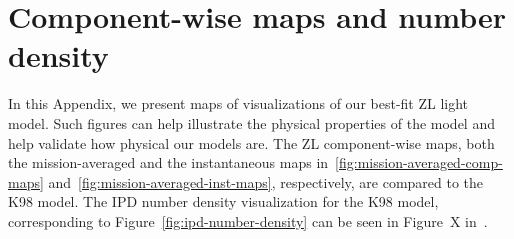 \documentclass[twocolumn]{aa}
\begin{document}
\clearpage
\section{Component-wise maps and number density}
\label{sec:zodi-comps}

In this Appendix, we present maps of visualizations of our best-fit ZL 
light model. Such figures can help illustrate the physical properties 
of the model and help validate how physical our models are. The ZL 
component-wise maps, both the mission-averaged and the instantaneous maps 
in~\ref{fig:mission-averaged-comp-maps} 
and~\ref{fig:mission-averaged-inst-maps}, respectively, are compared to 
the K98 model. The IPD number density visualization for the K98 model, 
corresponding to Figure~\ref{fig:ipd-number-density} can be seen in 
Figure~X in~\cite{San2022}.


\end{document}
